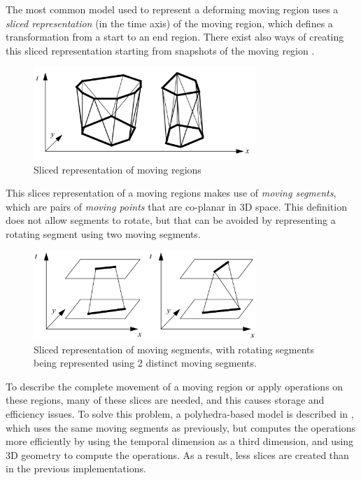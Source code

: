 The most common model used to represent a deforming moving region uses a \textit{sliced representation} \cite{algos_for_mod,model_structure_for_mod} (in the time axis) of the moving region, which defines a transformation from a start to an end region. There exist also ways of creating this sliced representation starting from snapshots of the moving region \cite{repr_from_obs}.

\begin{figure}[h!]
    \centering
    \includegraphics[width=0.75\textwidth]{images/sliced_moving_region.png}
    \caption[Sliced representation of moving regions]{Sliced representation of moving regions \cite{polyhedra}}
    \label{fig:sliced_repr_polygons}
\end{figure}

This slices representation of a moving regions makes use of \textit{moving segments}, which are pairs of \textit{moving points} that are co-planar in 3D space. This definition does not allow segments to rotate, but that can be avoided by representing a rotating segment using two moving segments.

\begin{figure}[h!]
    \centering
    \includegraphics[width=0.75\textwidth]{images/sliced_moving_segments.png}
    \caption[Sliced representation of moving segments]{Sliced representation of moving segments, with rotating segments being represented using 2 distinct moving segments. \cite{polyhedra}}
    \label{fig:sliced_repr_segments}
\end{figure}


To describe the complete movement of a moving region or apply operations on these regions, many of these slices are needed, and this causes storage and efficiency issues. To solve this problem, a polyhedra-based model is described in \cite{polyhedra}, which uses the same moving segments as previously, but computes the operations more efficiently by using the temporal dimension as a third dimension, and using 3D geometry to compute the operations. As a result, less slices are created than in the previous implementations.

